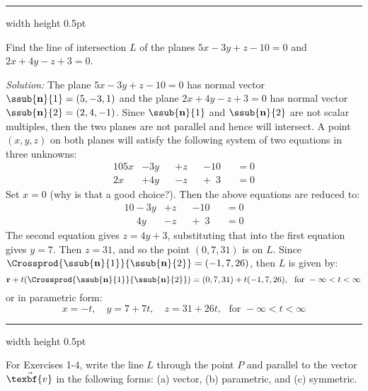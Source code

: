 \vspace{4mm}
\hrule width \textwidth height 0.5pt
\begin{exmp}\label{exmp:planeinter}
 Find the line of intersection $L$ of the planes $5x - 3y + z - 10 = 0$ and $2x + 4y - z + 3 = 0$.\vspace{1mm}
 \par\noindent\emph{Solution:} The plane $5x - 3y + z - 10 = 0$ has normal vector $\ssub{\textbf{n}}{1} = (5,-3,1)$ and
 the plane $2x + 4y - z + 3 = 0$ has normal vector $\ssub{\textbf{n}}{2} = (2,4,-1)$. Since $\ssub{\textbf{n}}{1}$ and
 $\ssub{\textbf{n}}{2}$ are not scalar multiples, then the two planes are not parallel and hence will intersect. A
 point $(x,y,z)$ on both planes will satisfy the following system of two equations in three unknowns:
 \begin{alignat*}{10}
  5x &- 3y &&+ z &&- 10 &&= 0\\
  2x &+ 4y &&- z &&+ \phantom{1}3 &&= 0
 \end{alignat*}
 Set $x = 0$ (why is that a good choice?). Then the above equations are reduced to:
 \begin{alignat*}{10}
  -3y &+ z &&- 10 &&= 0\\
  \phantom{-}4y &- z &&+ \phantom{1}3 &&= 0
 \end{alignat*}
 The second equation gives $z = 4y + 3$, substituting that into the first equation gives $y = 7$. Then $z = 31$,
 and so the point $(0,7,31)$ is on $L$. Since $\Crossprod{\ssub{\textbf{n}}{1}}{\ssub{\textbf{n}}{2}} = (-1,7,26)$,
 then $L$ is given by:
 \begin{displaymath}
  \textbf{r} + t(\Crossprod{\ssub{\textbf{n}}{1}}{\ssub{\textbf{n}}{2}}) = (0,7,31) + t(-1,7,26), \text{~~for~}
  -\infty < t < \infty
 \end{displaymath}
 or in parametric form:
 \begin{displaymath}
  x = -t, \quad y = 7 + 7t, \quad z = 31 +26t, \text{~~for~} -\infty < t < \infty
 \end{displaymath} 
\end{exmp}
\hrule width \textwidth height 0.5pt
\newpage
\centerline{}\label{sec1dot5}
\par\noindent For Exercises 1-4, write the line $L$ through the point $P$ and parallel to the vector $\vec{\texbf{v}}$ in the
 following forms: (a) vector, (b) parametric, and (c) symmetric.
